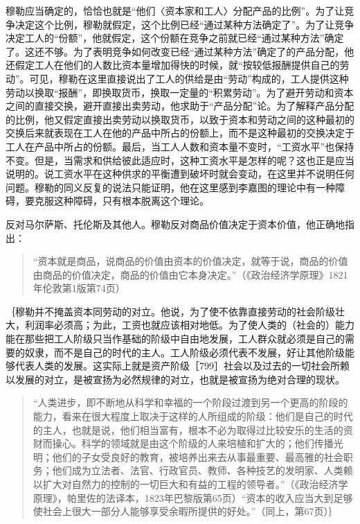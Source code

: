 穆勒应当确定的，恰恰也就是“他们〈资本家和工人〉分配产品的比例”。为了让竞争决定这个比例，穆勒就假定，这个比例已经“通过某种方法确定了”。为了让竞争决定工人的“份额”，他就假定，这个份额在竞争之前就已经“通过某种方法”确定了。这还不够。为了表明竞争如何改变已经“通过某种方法”确定了的产品分配，他还假定工人在他们的人数比资本量增加得快的时候，就“按较低报酬提供自己的劳动”。可见，穆勒在这里直接说出了工人的供给是由“劳动”构成的，工人提供这种劳动以换取“报酬”，即换取货币，换取一定量的“积累劳动”。为了避开劳动和资本之间的直接交换，避开直接出卖劳动，他求助于“产品分配”论。为了解释产品分配的比例，他又假定直接出卖劳动以换取货币，以致于资本和劳动之间的这种最初的交换后来就表现在工人在他的产品中所占的份额上，而不是这种最初的交换决定于工人在产品中所占的份额。最后，当工人人数和资本量不变时，“工资水平”也保持不变。但是，当需求和供给彼此适应时，这种工资水平是怎样的呢？这也正是应当说明的。说工资水平在这种供求的平衡遭到破坏时就会变动，在这里并不说明任何问题。穆勒的同义反复的说法只能证明，他在这里感到李嘉图的理论中有一种障碍，要克服这种障碍，只有根本脱离这个理论。


反对马尔萨斯、托伦斯及其他人。穆勒反对商品价值决定于资本价值，他正确地指出：

\begin{quote}{“资本就是商品，说商品的价值由资本的价值决定，就等于说，商品的价值由商品的价值决定，商品的价值由它本身决定。”（《政治经济学原理》1821年伦敦第1版第74页）}\end{quote}


｛穆勒并不掩盖资本同劳动的对立。他说，为了使不依靠直接劳动的社会阶级壮大，利润率必须高；为此，工资也就应该相对地低。为了使人类的（社会的）能力能在那些把工人阶级只当作基础的阶级中自由地发展，工人群众就必须是自己的需要的奴隶，而不是自己的时代的主人。工人阶级必须代表不发展，好让其他阶级能够代表人类的发展。这实际上就是资产阶级［799］社会以及过去的一切社会所赖以发展的对立，是被宣扬为必然规律的对立，也就是被宣扬为绝对合理的现状。

\begin{quote}{“人类进步，即不断地从科学和幸福的一个阶段过渡到另一个更高的阶段的能力，看来在很大程度上取决于这样的人所组成的阶级：他们是自己的时代的主人，也就是说，他们相当富有，根本不必为取得过比较安乐的生活的资财而操心。科学的领域就是由这个阶级的人来培植和扩大的；他们传播光明；他们的子女受良好的教育，被培养出来去从事最重要、最高雅的社会职务；他们成为立法者、法官、行政官员、教师、各种技艺的发明家、人类赖以扩大对自然力的控制的一切巨大和有益的工程的领导者。”（《政治经济学原理》，帕里佐的法译本，1823年巴黎版第65页）“资本的收入应当大到足够使社会上很大一部分人能够享受余暇所提供的好处。”（同上，第67页）｝}\end{quote}

